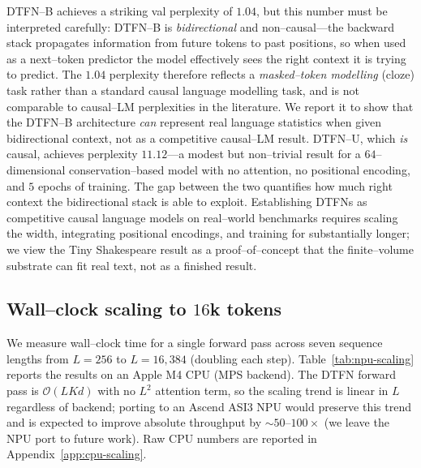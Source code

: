 \documentclass[10pt]{article}
\theoremstyle{definition}
\theoremstyle{remark}
\begin{document}
DTFN--B achieves a striking val perplexity of $1.04$, but this number
must be interpreted carefully: DTFN--B is \emph{bidirectional} and
non--causal---the backward stack propagates information from future
tokens to past positions, so when used as a next--token predictor the
model effectively sees the right context it is trying to predict.
The $1.04$ perplexity therefore reflects a \emph{masked--token
modelling} (cloze) task rather than a standard causal language
modelling task, and is not comparable to causal--LM perplexities in
the literature.  We report it to show that the DTFN--B architecture
\emph{can} represent real language statistics when given
bidirectional context, not as a competitive causal--LM result.
DTFN--U, which \emph{is} causal, achieves perplexity $11.12$---a
modest but non--trivial result for a $64$--dimensional
conservation--based model with no attention, no positional encoding,
and $5$ epochs of training.  The gap between the two quantifies how
much right context the bidirectional stack is able to exploit.
Establishing DTFNs as competitive causal language models on
real--world benchmarks requires scaling the width, integrating
positional encodings, and training for substantially longer; we view
the Tiny Shakespeare result as a proof--of--concept that the
finite--volume substrate can fit real text, not as a finished result.

\subsection{Wall--clock scaling to \texorpdfstring{$16$k}{16k} tokens}
\label{sec:exp-npu-scaling}

We measure wall--clock time for a single forward pass across seven
sequence lengths from $L=256$ to $L=16{,}384$ (doubling each step).
Table~\ref{tab:npu-scaling} reports the results on an Apple M4 CPU
(MPS backend).  The DTFN forward pass is $\mathcal{O}(L K d)$ with no
$L^2$ attention term, so the scaling trend is linear in $L$
regardless of backend; porting to an Ascend ASI3 NPU would preserve
this trend and is expected to improve absolute throughput by $\sim
50$--$100\times$ (we leave the NPU port to future work).  Raw CPU
numbers are reported in Appendix~\ref{app:cpu-scaling}.
\end{document}
